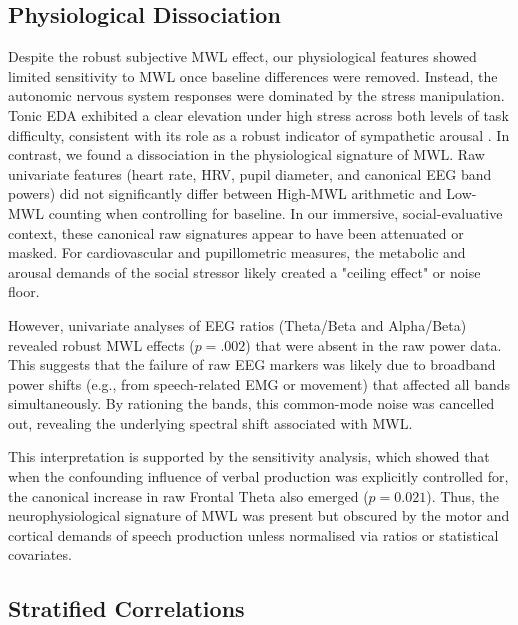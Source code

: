 \documentclass[lettersize,journal]{IEEEtran}
\begin{document}
\subsection{Physiological Dissociation}

Despite the robust subjective MWL effect, our physiological features showed limited sensitivity to MWL once baseline differences were removed. Instead, the autonomic nervous system responses were dominated by the stress manipulation. Tonic EDA exhibited a clear elevation under high stress across both levels of task difficulty, consistent with its role as a robust indicator of sympathetic arousal \cite{faircloughFundamentalsPhysiologicalComputing2009, masiStressWorkloadAssessment2023}. In contrast, we found a dissociation in the physiological signature of MWL. Raw univariate features (heart rate, HRV, pupil diameter, and canonical EEG band powers) did not significantly differ between High-MWL arithmetic and Low-MWL counting when controlling for baseline. In our immersive, social-evaluative context, these canonical raw signatures appear to have been attenuated or masked. For cardiovascular and pupillometric measures, the metabolic and arousal demands of the social stressor likely created a "ceiling effect" or noise floor. 

However, univariate analyses of EEG ratios (Theta/Beta and Alpha/Beta) revealed robust MWL effects ($p=.002$) that were absent in the raw power data. This suggests that the failure of raw EEG markers was likely due to broadband power shifts (e.g., from speech-related EMG or movement) that affected all bands simultaneously. By rationing the bands, this common-mode noise was cancelled out, revealing the underlying spectral shift associated with MWL.

This interpretation is supported by the sensitivity analysis, which showed that when the confounding influence of verbal production was explicitly controlled for, the canonical increase in raw Frontal Theta also emerged ($p=0.021$). Thus, the neurophysiological signature of MWL was present but obscured by the motor and cortical demands of speech production unless normalised via ratios or statistical covariates.

\subsection{Stratified Correlations}
\end{document}
